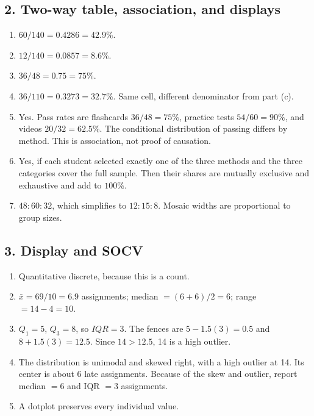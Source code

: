 \documentclass[11pt]{article}
\newcommand{\ans}[1]{\textcolor{AnswerBlue}{#1}}
\begin{document}
\subsection*{2. Two-way table, association, and displays}
\begin{answerbox}
\begin{enumerate}[label=\alph*.]
  \item \ans{$60/140=0.4286=42.9\%$.}
  \item \ans{$12/140=0.0857=8.6\%$.}
  \item \ans{$36/48=0.75=75\%$.}
  \item \ans{$36/110=0.3273=32.7\%$.} Same cell, different denominator from part (c).
  \item \ans{Yes. Pass rates are flashcards $36/48=75\%$, practice tests $54/60=90\%$, and videos $20/32=62.5\%$. The conditional distribution of passing differs by method. This is association, not proof of causation.}
  \item \ans{Yes, if each student selected exactly one of the three methods and the three categories cover the full sample. Then their shares are mutually exclusive and exhaustive and add to $100\%$.}
  \item \ans{$48:60:32$, which simplifies to $12:15:8$. Mosaic widths are proportional to group sizes.}
\end{enumerate}
\end{answerbox}

\subsection*{3. Display and SOCV}
\begin{answerbox}
\begin{enumerate}[label=\alph*.]
  \item \ans{Quantitative discrete, because this is a count.}
  \item \ans{$\bar{x}=69/10=6.9$ assignments; median $=(6+6)/2=6$; range $=14-4=10$.}
  \item \ans{$Q_1=5$, $Q_3=8$, so $IQR=3$. The fences are $5-1.5(3)=0.5$ and $8+1.5(3)=12.5$. Since $14>12.5$, 14 is a high outlier.}
  \item \ans{The distribution is unimodal and skewed right, with a high outlier at 14. Its center is about 6 late assignments. Because of the skew and outlier, report median $=6$ and IQR $=3$ assignments.}
  \item \ans{A dotplot preserves every individual value.}
\end{enumerate}
\end{answerbox}
\end{document}
